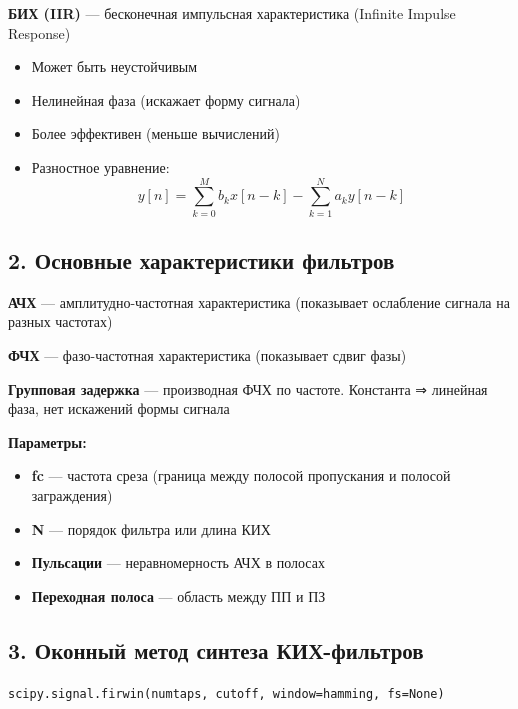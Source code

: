 \documentclass[12pt,a4paper,openany]{book}
\providecommand{\tightlist}{\setlength{\itemsep}{0pt}\setlength{\parskip}{0pt}}
\begin{document}
\textbf{БИХ (IIR)} --- бесконечная импульсная характеристика (Infinite Impulse Response)

\begin{itemize}
\tightlist
\item
  Может быть неустойчивым
\item
  Нелинейная фаза (искажает форму сигнала)
\item
  Более эффективен (меньше вычислений)
\item
  Разностное уравнение:
  \[
  y[n] = \sum_{k=0}^{M} b_k x[n-k] - \sum_{k=1}^{N} a_k y[n-k]
  \]
\end{itemize}

\subsection*{2. Основные характеристики фильтров}

\textbf{АЧХ} --- амплитудно-частотная характеристика (показывает ослабление сигнала на разных частотах)

\textbf{ФЧХ} --- фазо-частотная характеристика (показывает сдвиг фазы)

\textbf{Групповая задержка} --- производная ФЧХ по частоте. Константа ⇒ линейная фаза, нет искажений формы сигнала

\textbf{Параметры:}

\begin{itemize}
\tightlist
\item
  \textbf{fc} --- частота среза (граница между полосой пропускания и полосой заграждения)
\item
  \textbf{N} --- порядок фильтра или длина КИХ
\item
  \textbf{Пульсации} --- неравномерность АЧХ в полосах
\item
  \textbf{Переходная полоса} --- область между ПП и ПЗ
\end{itemize}

\subsection*{3. Оконный метод синтеза КИХ-фильтров}

\texttt{scipy.\allowbreak{}signal.\allowbreak{}firwin(\allowbreak{}numtaps,\allowbreak{}\ cutoff,\allowbreak{}\ window=\allowbreak{}\textquotesingle{}\allowbreak{}hamming\textquotesingle{}\allowbreak{},\allowbreak{}\ fs=\allowbreak{}None)}
\end{document}
